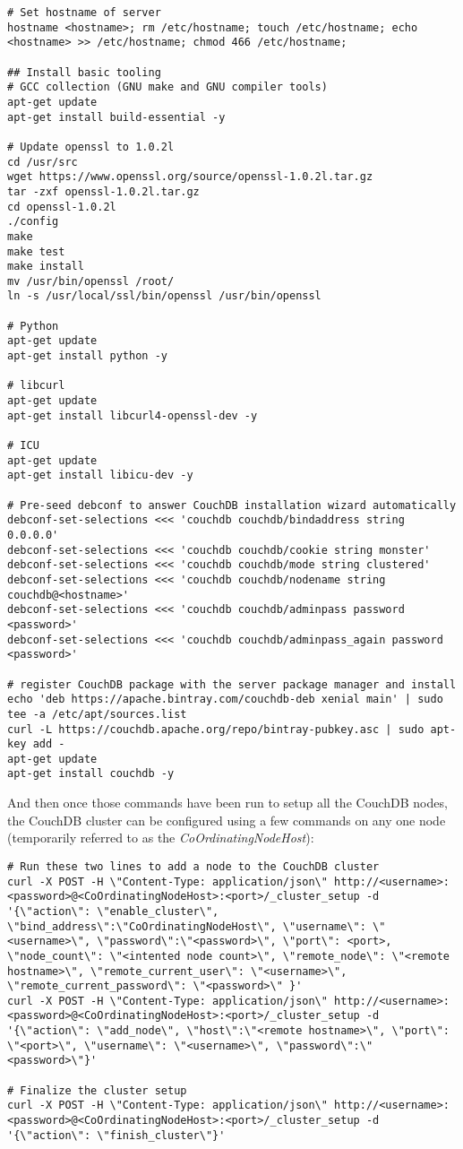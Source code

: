 \begin{verbatim}
# Set hostname of server
hostname <hostname>; rm /etc/hostname; touch /etc/hostname; echo <hostname> >> /etc/hostname; chmod 466 /etc/hostname;

## Install basic tooling 
# GCC collection (GNU make and GNU compiler tools)
apt-get update
apt-get install build-essential -y

# Update openssl to 1.0.2l
cd /usr/src
wget https://www.openssl.org/source/openssl-1.0.2l.tar.gz
tar -zxf openssl-1.0.2l.tar.gz
cd openssl-1.0.2l
./config
make
make test
make install
mv /usr/bin/openssl /root/
ln -s /usr/local/ssl/bin/openssl /usr/bin/openssl

# Python
apt-get update
apt-get install python -y

# libcurl
apt-get update
apt-get install libcurl4-openssl-dev -y

# ICU
apt-get update
apt-get install libicu-dev -y

# Pre-seed debconf to answer CouchDB installation wizard automatically
debconf-set-selections <<< 'couchdb couchdb/bindaddress string 0.0.0.0'
debconf-set-selections <<< 'couchdb couchdb/cookie string monster'
debconf-set-selections <<< 'couchdb couchdb/mode string clustered'
debconf-set-selections <<< 'couchdb couchdb/nodename string couchdb@<hostname>'
debconf-set-selections <<< 'couchdb couchdb/adminpass password <password>'
debconf-set-selections <<< 'couchdb couchdb/adminpass_again password <password>'

# register CouchDB package with the server package manager and install
echo 'deb https://apache.bintray.com/couchdb-deb xenial main' | sudo tee -a /etc/apt/sources.list
curl -L https://couchdb.apache.org/repo/bintray-pubkey.asc | sudo apt-key add -
apt-get update
apt-get install couchdb -y
\end{verbatim}

And then once those commands have been run to setup all the CouchDB nodes, the CouchDB cluster can be configured using a few commands on any one node (temporarily referred to as the \textit{CoOrdinatingNodeHost}):

\begin{verbatim}
# Run these two lines to add a node to the CouchDB cluster
curl -X POST -H \"Content-Type: application/json\" http://<username>:<password>@<CoOrdinatingNodeHost>:<port>/_cluster_setup -d '{\"action\": \"enable_cluster\", \"bind_address\":\"CoOrdinatingNodeHost\", \"username\": \"<username>\", \"password\":\"<password>\", \"port\": <port>, \"node_count\": \"<intented node count>\", \"remote_node\": \"<remote hostname>\", \"remote_current_user\": \"<username>\", \"remote_current_password\": \"<password>\" }'
curl -X POST -H \"Content-Type: application/json\" http://<username>:<password>@<CoOrdinatingNodeHost>:<port>/_cluster_setup -d '{\"action\": \"add_node\", \"host\":\"<remote hostname>\", \"port\": \"<port>\", \"username\": \"<username>\", \"password\":\"<password>\"}'

# Finalize the cluster setup
curl -X POST -H \"Content-Type: application/json\" http://<username>:<password>@<CoOrdinatingNodeHost>:<port>/_cluster_setup -d '{\"action\": \"finish_cluster\"}'
\end{verbatim}